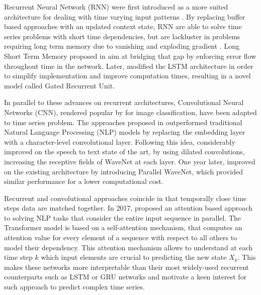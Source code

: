 \documentclass[12pt]{article}
\begin{document}
Recurrent Neural Network (RNN) were first introduced as a more suited architecture for dealing with time varying input patterns \cite{Mozer1989AFB}. By replacing buffer based approaches with an updated context state, RNN are able to solve time series problems with short time dependencies, but are lackluster in problems requiring long term memory due to vanishing and exploding gradient \cite{Bengio1994LearningLD}. Long Short Term Memory proposed in \cite{Hochreiter1997LongSM} aim at bridging that gap by enforcing error flow throughout time in the network. Later, \cite{Cho2014LearningPR} modified the LSTM architecture in order to simplify implementation and improve computation times, resulting in a novel model called Gated Recurrent Unit.

In parallel to these advances on recurrent architectures, Convolutional Neural Networks (CNN), rendered popular by \cite{Krizhevsky2012ImageNetCW} for image classification, have been adapted to time series problem. The approaches proposed in \cite{Jzefowicz2016ExploringTL,Kim2016CharacterAwareNL} outperformed traditional Natural Language Processing (NLP) models by replacing the embedding layer with a character-level convolutional layer. Following this idea, \cite{Oord2016WaveNetAG} considerably improved on the speech to text state of the art, by using dilated convolutions, increasing the receptive fields of WaveNet at each layer. One year later, \cite{Oord2017ParallelWF} improved on the existing architecture by introducing Parallel WaveNet, which provided similar performance for a lower computational cost.

Recurrent and convolutional approaches coincide in that temporally close time steps data are matched together. In 2017, \cite{Vaswani2017AttentionIA} proposed an attention based approach to solving NLP tasks that consider the entire input sequence in parallel. The Transformer model is based on a self-attention mechanism, that computes an attention value for every element of a sequence with respect to all others to model their dependency. This attention mechanism allows to understand at each time step $k$ which input elements are crucial to predicting the new state $X_k$. This makes these networks more interpretable than their most widely-used recurrent counterparts such as LSTM or GRU networks and motivate a keen interest for such approach to predict complex time series.
\end{document}
